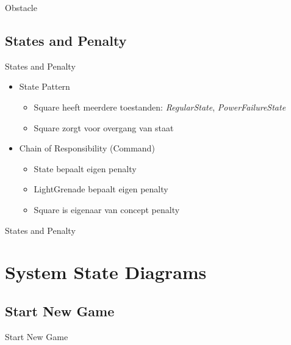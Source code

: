 \documentclass[t]{beamer}
\begin{document}
\begin{frame}{Obstacle}
\begin{center}
\end{center}
\end{frame}

\subsection{States and Penalty}

\begin{frame}{States and Penalty}
\begin{itemize}
	\item State Pattern
	\begin{itemize}
		\item Square heeft meerdere toestanden: \textit{RegularState}, \textit{PowerFailureState}
		\item Square zorgt voor overgang van staat
	\end{itemize}
	\item Chain of Responsibility (Command)
	\begin{itemize}
		\item State bepaalt eigen penalty
		\item LightGrenade bepaalt eigen penalty
		\item Square is eigenaar van concept penalty
	\end{itemize}
\end{itemize}
\end{frame}

\begin{frame}{States and Penalty}
\begin{center}
\end{center}
\end{frame}


\section{System State Diagrams}
\subsection{Start New Game}
\begin{frame}{Start New Game}
\begin{center}
\end{center}
\end{frame}
\end{document}
